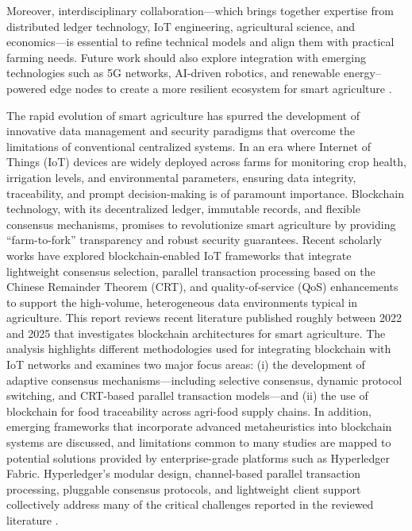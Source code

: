 \documentclass[12pt,onecolumn]{IEEEtran} %
\begin{document}
Moreover, interdisciplinary collaboration---which brings together expertise from distributed ledger technology, IoT engineering, agricultural science, and economics---is essential to refine technical models and align them with practical farming needs. Future work should also explore integration with emerging technologies such as 5G networks, AI-driven robotics, and renewable energy--powered edge nodes to create a more resilient ecosystem for smart agriculture \cite{thiruvenkatasamy2025anonlinetool, alazzai2024smartagriculturesolutions}.

The rapid evolution of smart agriculture has spurred the development of innovative data management and security paradigms that overcome the limitations of conventional centralized systems. In an era where Internet of Things (IoT) devices are widely deployed across farms for monitoring crop health, irrigation levels, and environmental parameters, ensuring data integrity, traceability, and prompt decision-making is of paramount importance. Blockchain technology, with its decentralized ledger, immutable records, and flexible consensus mechanisms, promises to revolutionize smart agriculture by providing ``farm-to-fork'' transparency and robust security guarantees. Recent scholarly works \cite{ali2022blockchainenabledarchitecture, aliyu2023blockchainbasedsmartfarm} have explored blockchain-enabled IoT frameworks that integrate lightweight consensus selection, parallel transaction processing based on the Chinese Remainder Theorem (CRT), and quality-of-service (QoS) enhancements to support the high-volume, heterogeneous data environments typical in agriculture.  This report reviews recent literature published roughly between 2022 and 2025 that investigates blockchain architectures for smart agriculture. The analysis highlights different methodologies used for integrating blockchain with IoT networks and examines two major focus areas: (i) the development of adaptive consensus mechanisms---including selective consensus, dynamic protocol switching, and CRT-based parallel transaction models---and (ii) the use of blockchain for food traceability across agri-food supply chains. In addition, emerging frameworks that incorporate advanced metaheuristics into blockchain systems are discussed, and limitations common to many studies are mapped to potential solutions provided by enterprise-grade platforms such as Hyperledger Fabric. Hyperledger's modular design, channel-based parallel transaction processing, pluggable consensus protocols, and lightweight client support collectively address many of the critical challenges reported in the reviewed literature \cite{ali2022blockchainenabledarchitecture}.  
\end{document}
